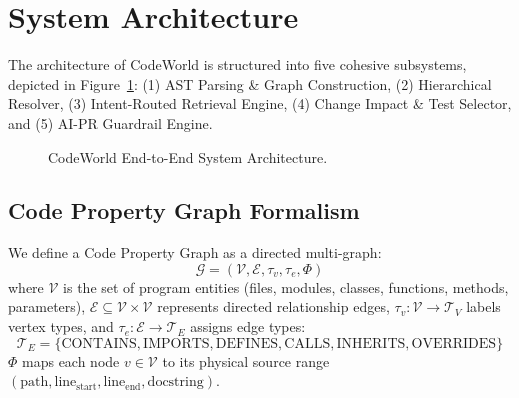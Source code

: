 \documentclass[conference]{IEEEtran}
\begin{document}
\section{System Architecture}
\label{sec:arch}

The architecture of CodeWorld is structured into five cohesive subsystems, depicted in Figure~\ref{fig:architecture_diagram}: (1) AST Parsing \& Graph Construction, (2) Hierarchical Resolver, (3) Intent-Routed Retrieval Engine, (4) Change Impact \& Test Selector, and (5) AI-PR Guardrail Engine.

\begin{figure}[t]
\centering
{}
\caption{CodeWorld End-to-End System Architecture.}
\label{fig:architecture_diagram}
\end{figure}

\subsection{Code Property Graph Formalism}
We define a Code Property Graph as a directed multi-graph:
\begin{equation}
\mathcal{G} = (\mathcal{V}, \mathcal{E}, \tau_v, \tau_e, \Phi)
\end{equation}
where $\mathcal{V}$ is the set of program entities (files, modules, classes, functions, methods, parameters), $\mathcal{E} \subseteq \mathcal{V} \times \mathcal{V}$ represents directed relationship edges, $\tau_v: \mathcal{V} \to \mathcal{T}_V$ labels vertex types, and $\tau_e: \mathcal{E} \to \mathcal{T}_E$ assigns edge types:
\begin{equation}
\mathcal{T}_E = \{\text{CONTAINS}, \text{IMPORTS}, \text{DEFINES}, \text{CALLS}, \text{INHERITS}, \text{OVERRIDES}\}
\end{equation}
$\Phi$ maps each node $v \in \mathcal{V}$ to its physical source range $(\text{path}, \text{line}_{\text{start}}, \text{line}_{\text{end}}, \text{docstring})$.
\end{document}
